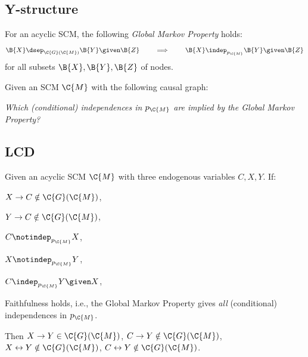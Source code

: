 \documentclass{article}
\newcommand\question[1]{\noindent \textit{#1}}
\newcommand{\oto}{\leftrightarrow}
\begin{document}
\subsection{Y-structure}

\begin{theorem}
  For an acyclic SCM, the following \emph{Global Markov Property} holds:
  $$\B{X} \dsep_{\C{G}(\C{M})} \B{Y} \given \B{Z} \qquad \implies \qquad \B{X} \indep_{p_{\C{M}}} \B{Y} \given \B{Z}$$
  for all subsets $\B{X}, \B{Y}, \B{Z}$ of nodes.
\end{theorem}

Given an SCM $\C{M}$ with the following causal graph:
\begin{center}
\end{center}

\question{Which (conditional) independences in $p_{\C{M}}$ are implied by the Global Markov Property?}

\subsection{LCD}

\begin{theorem}[Cooper, 1997]
Given an acyclic SCM $\C{M}$ with three endogenous variables $C,X,Y$. If:
\begin{compactenum}
  \item $X \to C \notin \C{G}(\C{M})$, 
  \item $Y \to C \notin \C{G}(\C{M})$,
  \item $C \notindep_{p_{\C{M}}} X$, 
  \item $X \notindep_{p_{\C{M}}} Y$,
  \item $C \indep_{p_{\C{M}}} Y \given X$, 
  \item Faithfulness holds, i.e., the Global Markov Property gives \emph{all} (conditional) independences in $p_{\C{M}}$.
\end{compactenum}
  Then $X \to Y \in \C{G}(\C{M})$, $C \to Y \notin \C{G}(\C{M})$, $X \leftrightarrow Y \notin \C{G}(\C{M})$, $C \oto Y \notin \C{G}(\C{M})$.
\end{theorem}
\end{document}
